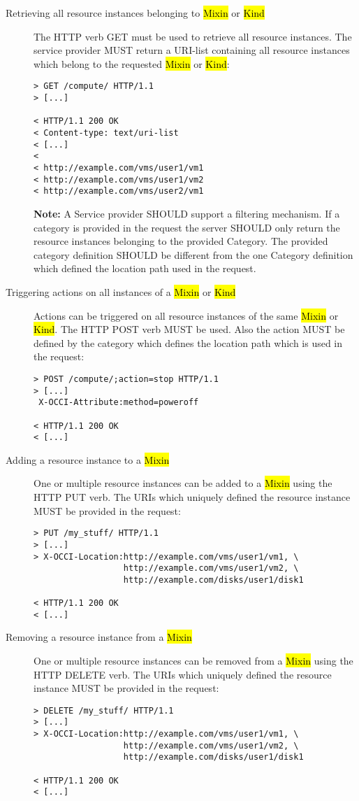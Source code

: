 \documentclass[10pt,a4paper]{article}
\begin{document}
\begin{description}
\item[Retrieving all resource instances belonging to \hl{Mixin} or
  \hl{Kind}] The HTTP verb GET must be used to retrieve all resource
  instances. The service provider MUST return a URI-list containing
  all resource instances which belong to the requested \hl{Mixin} or
  \hl{Kind}:
\begin{verbatim}
> GET /compute/ HTTP/1.1
> [...]
 
< HTTP/1.1 200 OK
< Content-type: text/uri-list
< [...]
< 
< http://example.com/vms/user1/vm1
< http://example.com/vms/user1/vm2
< http://example.com/vms/user2/vm1
\end{verbatim}
\textbf{Note:} A Service provider SHOULD support a filtering
mechanism. If a category is provided in the request the server SHOULD
only return the resource instances belonging to the provided
Category. The provided category definition SHOULD be different from
the one Category definition which defined the location path used in
the request.

\item[Triggering actions on all instances of a \hl{Mixin} or
  \hl{Kind}] Actions can be triggered on all resource instances of the
  same \hl{Mixin} or \hl{Kind}. The HTTP POST verb MUST be used. Also
  the action MUST be defined by the category which defines the
  location path which is used in the request:
\begin{verbatim}
> POST /compute/;action=stop HTTP/1.1
> [...]
 X-OCCI-Attribute:method=poweroff

< HTTP/1.1 200 OK
< [...]
\end{verbatim}

\item[Adding a resource instance to a \hl{Mixin}] One or multiple
  resource instances can be added to a \hl{Mixin} using the HTTP PUT
  verb. The URIs which uniquely defined the resource instance MUST be
  provided in the request:
\begin{verbatim}
> PUT /my_stuff/ HTTP/1.1
> [...]
> X-OCCI-Location:http://example.com/vms/user1/vm1, \
                  http://example.com/vms/user1/vm2, \
                  http://example.com/disks/user1/disk1

< HTTP/1.1 200 OK
< [...]
\end{verbatim}

\item[Removing a resource instance from a \hl{Mixin}] One or multiple
  resource instances can be removed from a \hl{Mixin} using the HTTP
  DELETE verb. The URIs which uniquely defined the resource instance
  MUST be provided in the request:
\begin{verbatim}
> DELETE /my_stuff/ HTTP/1.1
> [...]
> X-OCCI-Location:http://example.com/vms/user1/vm1, \
                  http://example.com/vms/user1/vm2, \
                  http://example.com/disks/user1/disk1

< HTTP/1.1 200 OK
< [...]
\end{verbatim}
\end{description}
\end{document}
